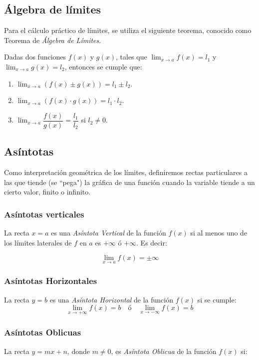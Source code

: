 \subsection{Álgebra de límites}
Para el cálculo práctico de límites, se utiliza el siguiente
teorema, conocido como Teorema de \emph{Álgebra de Límites}.

Dadas dos funciones $f(x)$ y $g(x)$, tales que $\lim_{x\rightarrow
a}f(x)=l_1$ y $\lim_{x\rightarrow a}g(x)=l_2$, entonces se cumple
que:
\begin{enumerate}
\item $\displaystyle \lim_{x\rightarrow a}(f(x)\pm g(x))=l_1\pm l_2$.
\item $\displaystyle \lim_{x\rightarrow a}(f(x)\cdot g(x))=l_1\cdot l_2$.
\item $\displaystyle \lim_{x\rightarrow a}\dfrac{f(x)}{g(x)}=\dfrac{l_1}{l_2}$ si $l_2\neq 0$.
\end{enumerate}

\subsection{Asíntotas}
Como interpretación geométrica de los límites, definiremos rectas
particulares a las que tiende (se ``pega") la gráfica de una función
cuando la variable tiende a un cierto valor, finito o infinito.
\subsubsection*{Asíntotas verticales}
La recta $x=a$ es una \emph{Asíntota Vertical} de la función $f(x)$
si al menos uno de los límites laterales de $f$ en $a$ es $+\infty$
ó $+\infty$. Es decir:

\[
\mathop {\lim }\limits_{x \to a} f(x) =  \pm \infty
\]

\subsubsection*{Asíntotas Horizontales}
La recta $y=b$ es una \emph{Asíntota Horizontal} de la función
$f(x)$ si se cumple:
\[
\mathop {\lim }\limits_{x \to  + \infty } f(x) = b\quad
\text{ó}\quad\mathop {\lim }\limits_{x \to  - \infty } f(x) = b
\]


\subsubsection*{Asíntotas Oblicuas}

La recta $y=mx+n$, donde $m\neq0$, es \emph{Asíntota Oblicua} de la
función $f(x)$ si:


